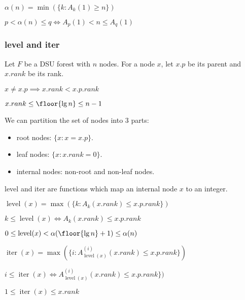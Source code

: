 \begin{definition} $\alpha(n) = \min(\{k: A_k(1) \ge n\})$ \end{definition}
\begin{theorem} $p < \alpha(n) \le q \iff A_p(1) < n \le A_q(1)$ \end{theorem}

\subsubsection{level and iter}

Let $F$ be a DSU forest with $n$ nodes.
For a node $x$, let $x.p$ be its parent and $x.rank$ be its rank.
\begin{theorem} $x \neq x.p \implies x.rank < x.p.rank$ \end{theorem}
\begin{theorem} $x.rank \le \floor{\lg n} \le n-1$ \end{theorem}

We can partition the set of nodes into 3 parts:
\begin{itemize}
\item root nodes: $\{x: x = x.p \}$.
\item leaf nodes: $\{x: x.rank = 0\}$.
\item internal nodes: non-root and non-leaf nodes.
\end{itemize}

level and iter are functions which map an internal node $x$ to an integer.

\begin{definition} $\operatorname{level}(x) = \max(\{k: A_k(x.rank) \le x.p.rank \})$ \end{definition}
\begin{theorem} $k \le \operatorname{level}(x) \iff A_k(x.rank) \le x.p.rank$ \end{theorem}
\begin{theorem} $0 \le \operatorname{level}(x) < \alpha(\floor{\lg n}+1) \le \alpha(n)$ \end{theorem}
\begin{definition} $\operatorname{iter}(x) = \max(\{i: A_{\operatorname{level}(x)}^{(i)}(x.rank) \le x.p.rank \})$ \end{definition}
\begin{theorem} $i \le \operatorname{iter}(x) \iff A_{\operatorname{level}(x)}^{(i)}(x.rank) \le x.p.rank \})$ \end{theorem}
\begin{theorem} $1 \le \operatorname{iter}(x) \le x.rank$ \end{theorem}

